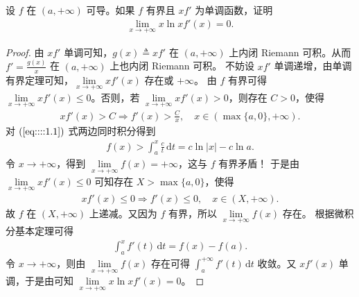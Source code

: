 \documentclass[../../main.tex]{subfiles}%
\begin{document}
\begin{example}
设 \(f\) 在 \((a,+\infty)\) 可导。如果 \(f\) 有界且 \(xf'\) 为单调函数，证明
\begin{align*}
\lim_{x \to +\infty} x\ln x f'(x) = 0.
\end{align*}
\end{example}
\begin{proof}
由 \(xf'\) 单调可知，\(g(x)\triangleq xf'\) 在 \((a, +\infty)\) 上内闭 Riemann 可积。从而 \(f' = \frac{g(x)}{x}\) 在 \((a, +\infty)\) 上也内闭 Riemann 可积。
不妨设 \(xf'\) 单调递增，由单调有界定理可知，\(\lim\limits_{x \to +\infty}xf'(x)\) 存在或 \(+\infty\)。
由 \(f\) 有界可得 \(\lim\limits_{x \to +\infty}xf'(x)\leqslant 0\)。否则，若 \(\lim\limits_{x \to +\infty}xf'(x)>0\)，则存在 \(C > 0\)，使得
\begin{align}
xf'(x)>C \Rightarrow f'(x)>\frac{C}{x}, \quad x\in (\max\{a,0\}, +\infty). \label{eq::::1.1}
\end{align}
对 \((\ref{eq::::1.1})\) 式两边同时积分得到
\begin{align*}
f(x)>\int_a^x\frac{c}{t}\,\mathrm{d}t = c\ln|x|-c\ln a.
\end{align*}
令 \(x \to +\infty\)，得到 \(\lim\limits_{x \to +\infty}f(x)=+\infty\)，这与 \(f\) 有界矛盾！
于是由 \(\lim\limits_{x \to +\infty}xf'(x)\leqslant 0\) 可知存在 \(X > \max\{a,0\}\)，使得
\begin{align*}
xf'(x)\leqslant 0 \Rightarrow f'(x)\leqslant 0, \quad x\in (X, +\infty).
\end{align*}
故 \(f\) 在 \((X, +\infty)\) 上递减。又因为 \(f\) 有界，所以 \(\lim\limits_{x \to +\infty}f(x)\) 存在。
根据微积分基本定理可得
\begin{align*}
\int_a^x f'(t)\,\mathrm{d}t = f(x)-f(a).
\end{align*}
令 \(x \to +\infty\)，则由 \(\lim\limits_{x \to +\infty}f(x)\) 存在可得 \(\int_a^{+\infty}f'(t)\,\mathrm{d}t\) 收敛。又 \(xf'(x)\) 单调，于是由可知 \(\lim\limits_{x \to +\infty}x\ln x f'(x)=0\)。 

\end{proof}
\end{document}
